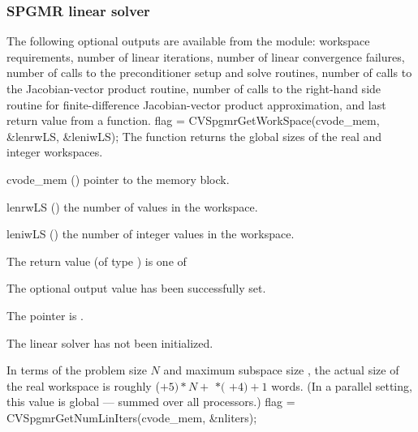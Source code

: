 \subsubsection{SPGMR linear solver}\label{sss:optout_spgmr}
The following optional outputs are available from the {\cvspgmr}
module: workspace requirements, number of linear iterations, number of
linear convergence failures, number of calls to the preconditioner
setup and solve routines, number of calls to the Jacobian-vector
product routine, number of calls to the right-hand side routine for
finite-difference Jacobian-vector product approximation, and last
return value from a {\cvspgmr} function.
{
  flag = CVSpgmrGetWorkSpace(cvode\_mem, \&lenrwLS, \&leniwLS);
}
{
  The function  returns the global sizes of the
  {\cvspgmr} real and integer workspaces.
}
{
  \begin{args}
  \item[cvode\_mem] ()
    pointer to the {\cvode} memory block.
  \item[lenrwLS] ()
    the number of  values in the {\cvspgmr} workspace.
  \item[leniwLS] ()
    the number of integer values in the {\cvspgmr} workspace.
  \end{args}
}
{
  The return value  (of type ) is one of
  \begin{args}
  \item[\Id{CVSPGMR\_SUCCESS}] 
    The optional output value has been successfully set.
  \item[\Id{CVSPGMR\_MEM\_NULL}]
    The  pointer is .
  \item[\Id{CVSPGMR\_LMEM\_NULL}]
    The {\cvspgmr} linear solver has not been initialized.
  \end{args}
}
{
  In terms of the problem size $N$ and maximum subspace size , 
  the actual size of the real workspace is roughly
  ($+ 5)*N +$  $*($ $ + 4) + 1$ 
  words.  (In a parallel setting, this value is global --- summed over
  all processors.)
}
{
  flag = CVSpgmrGetNumLinIters(cvode\_mem, \&nliters);
}
